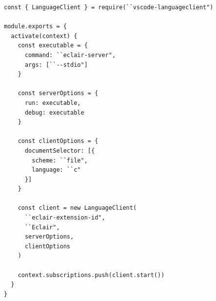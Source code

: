 \begin{lstlisting}[caption={First VSCode working extension}, label={lst:block_struct}]
const { LanguageClient } = require(``vscode-languageclient")

module.exports = {
  activate(context) {
    const executable = {
      command: ``eclair-server",
      args: [``--stdio"]
    }

    const serverOptions = {
      run: executable,
      debug: executable
    }

    const clientOptions = {
      documentSelector: [{
        scheme: ``file",
        language: ``c"
      }]
    }

    const client = new LanguageClient(
      ``eclair-extension-id",
      ``Eclair",
      serverOptions,
      clientOptions
    )

    context.subscriptions.push(client.start())
  }
}
\end{lstlisting}